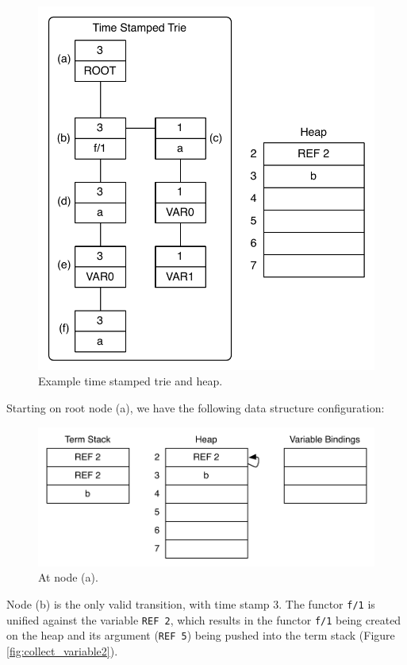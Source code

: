 \begin{figure}[ht]
  \centering
    \includegraphics[scale=0.6]{collect_variable.pdf}
  \caption{Example time stamped trie and heap.}
  \label{fig:collect_variable}
\end{figure}

Starting on root node (a), we have the following data structure configuration:

\begin{figure}[H]
  \centering
    \includegraphics[scale=0.6]{collect_variable1.pdf}
  \caption{At node (a).}
  \label{fig:collect_variable1}
\end{figure}

Node (b) is the only valid transition, with time stamp 3.
The functor \texttt{f/1} is unified against the variable \texttt{REF 2},
which results in the functor \texttt{f/1} being created on the heap
and its argument (\texttt{REF 5}) being pushed into the term stack
(Figure \ref{fig:collect_variable2}).

